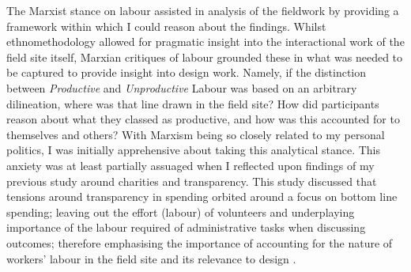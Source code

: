 The Marxist stance on labour assisted in analysis of the fieldwork by providing a framework within which I could reason about the findings. Whilst ethnomethodology allowed for pragmatic insight into the interactional work of the field site itself, Marxian critiques of labour grounded these in what was needed to be captured to provide insight into design work. Namely, if the distinction between \textit{Productive} and \textit{Unproductive} Labour was based on an arbitrary dilineation, where was that line drawn in the field site? How did participants reason about what they classed as productive, and how was this accounted for to themselves and others? With Marxism being so closely related to my personal politics, I was initially apprehensive about taking this analytical stance. This anxiety was at least partially assuaged when I reflected upon findings of my previous study around charities and transparency. This study discussed that tensions around transparency in spending orbited around a focus on bottom line spending; leaving out the effort (labour) of volunteers and underplaying importance of the labour required of administrative tasks when discussing outcomes; therefore emphasising the importance of accounting for the nature of workers' labour in the field site and its relevance to design \cite{marshall_accountable:_2016}.

